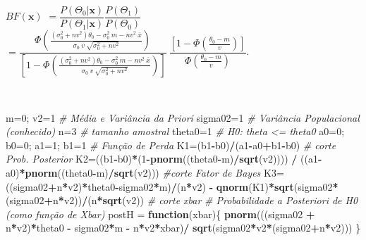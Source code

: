 \documentclass[
]{book}
\newenvironment{Shaded}{\begin{snugshade}}{\end{snugshade}}
\newcommand{\CommentTok}[1]{\textcolor[rgb]{0.56,0.35,0.01}{\textit{#1}}}
\newcommand{\ControlFlowTok}[1]{\textcolor[rgb]{0.13,0.29,0.53}{\textbf{#1}}}
\newcommand{\DecValTok}[1]{\textcolor[rgb]{0.00,0.00,0.81}{#1}}
\newcommand{\KeywordTok}[1]{\textcolor[rgb]{0.13,0.29,0.53}{\textbf{#1}}}
\newcommand{\NormalTok}[1]{#1}
\newcommand{\OperatorTok}[1]{\textcolor[rgb]{0.81,0.36,0.00}{\textbf{#1}}}
\newcommand{\StringTok}[1]{\textcolor[rgb]{0.31,0.60,0.02}{#1}}
\begin{document}
\(BF(\boldsymbol x)\)
\(= \dfrac{P(\Theta_0|\boldsymbol x)}{P(\Theta_1|\boldsymbol x)} \dfrac{P(\Theta_1)}{P(\Theta_0)}\)
\(= \dfrac{\Phi\left(\frac{({\sigma}_0^2+nv^2)\theta_0-{\sigma}_0^2~m-nv^2~\bar x}{{\sigma}_0~v~\sqrt{{\sigma}_0^2+nv^2}}\right)}{\left[1-\Phi\left(\frac{({\sigma}_0^2+nv^2)\theta_0-{\sigma}_0^2~m-nv^2~\bar x}{{\sigma}_0~v~\sqrt{{\sigma}_0^2+nv^2}}\right)\right]} ~ \dfrac{\left[1-\Phi\left(\frac{\theta_0-m}{v}\right)\right]}{\Phi\left(\frac{\theta_0-m}{v}\right)}\).

\(~\)

\begin{Shaded}
\begin{Highlighting}[]
\NormalTok{m=}\DecValTok{0}\NormalTok{; v2=}\DecValTok{1} \CommentTok{# Média e Variância da Priori}
\NormalTok{sigma02=}\DecValTok{1} \CommentTok{# Variância Populacional (conhecido)}
\NormalTok{n=}\DecValTok{3} \CommentTok{# tamanho amostral}
\NormalTok{theta0=}\DecValTok{1} \CommentTok{# H0: theta <= theta0}
\NormalTok{a0=}\DecValTok{0}\NormalTok{; b0=}\DecValTok{0}\NormalTok{; a1=}\DecValTok{1}\NormalTok{; b1=}\DecValTok{1} \CommentTok{# Função de Perda}
\NormalTok{K1=(b1}\OperatorTok{-}\NormalTok{b0)}\OperatorTok{/}\NormalTok{(a1}\OperatorTok{-}\NormalTok{a0}\OperatorTok{+}\NormalTok{b1}\OperatorTok{-}\NormalTok{b0) }\CommentTok{# corte Prob. Posterior}
\NormalTok{K2=((b1}\OperatorTok{-}\NormalTok{b0)}\OperatorTok{*}\NormalTok{(}\DecValTok{1}\OperatorTok{-}\KeywordTok{pnorm}\NormalTok{((theta0}\OperatorTok{-}\NormalTok{m)}\OperatorTok{/}\KeywordTok{sqrt}\NormalTok{(v2)))) }\OperatorTok{/}\StringTok{ }\NormalTok{((a1}\OperatorTok{-}\NormalTok{a0)}\OperatorTok{*}\KeywordTok{pnorm}\NormalTok{((theta0}\OperatorTok{-}\NormalTok{m)}\OperatorTok{/}\KeywordTok{sqrt}\NormalTok{(v2))) }\CommentTok{#corte Fator de Bayes}
\NormalTok{K3=((sigma02}\OperatorTok{+}\NormalTok{n}\OperatorTok{*}\NormalTok{v2)}\OperatorTok{*}\NormalTok{theta0}\OperatorTok{-}\NormalTok{sigma02}\OperatorTok{*}\NormalTok{m)}\OperatorTok{/}\NormalTok{(n}\OperatorTok{*}\NormalTok{v2) }\OperatorTok{-}\StringTok{ }\KeywordTok{qnorm}\NormalTok{(K1)}\OperatorTok{*}\KeywordTok{sqrt}\NormalTok{(sigma02}\OperatorTok{*}\NormalTok{(sigma02}\OperatorTok{+}\NormalTok{n}\OperatorTok{*}\NormalTok{v2))}\OperatorTok{/}\NormalTok{(n}\OperatorTok{*}\KeywordTok{sqrt}\NormalTok{(v2)) }\CommentTok{# corte xbar}
\CommentTok{# Probabilidade a Posteriori de H0 (como função de Xbar)}
\NormalTok{postH =}\StringTok{ }\ControlFlowTok{function}\NormalTok{(xbar)\{}
  \KeywordTok{pnorm}\NormalTok{(((sigma02 }\OperatorTok{+}\StringTok{ }\NormalTok{n}\OperatorTok{*}\NormalTok{v2)}\OperatorTok{*}\NormalTok{theta0 }\OperatorTok{-}\StringTok{ }\NormalTok{sigma02}\OperatorTok{*}\NormalTok{m }\OperatorTok{-}\StringTok{ }\NormalTok{n}\OperatorTok{*}\NormalTok{v2}\OperatorTok{*}\NormalTok{xbar)}\OperatorTok{/}\StringTok{ }\KeywordTok{sqrt}\NormalTok{(sigma02}\OperatorTok{*}\NormalTok{v2}\OperatorTok{*}\NormalTok{(sigma02}\OperatorTok{+}\NormalTok{n}\OperatorTok{*}\NormalTok{v2))) \}}

\end{Highlighting}
\end{Shaded}
\end{document}
